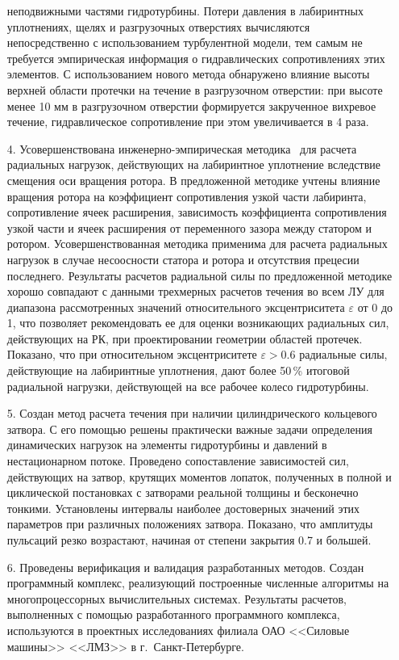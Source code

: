 \begin{enumerate}
            неподвижными частями гидротурбины. Потери давления в лабиринтных уплотнениях, щелях и разгрузочных 
            отверстиях вычисляются непосредственно с использованием турбулентной модели, тем самым не 
            требуется эмпирическая информация о гидравлических сопротивлениях этих элементов. 
            С использованием нового метода обнаружено влияние высоты верхней области протечки на течение в 
            разгрузочном отверстии: при высоте менее 10 мм в разгрузочном отверстии формируется закрученное 
            вихревое течение, гидравлическое сопротивление при этом увеличивается в 4 раза. 
  \item[4.] Усовершенствована инженерно-эмпирическая методика~\cite{lomakin} для расчета радиальных нагрузок, 
            действующих на лабиринтное уплотнение вследствие смещения оси вращения ротора. В предложенной 
            методике учтены влияние вращения ротора на коэффициент сопротивления узкой части лабиринта, 
            сопротивление ячеек расширения, зависимость коэффициента сопротивления узкой части и ячеек 
            расширения от переменного зазора между статором и ротором. Усовершенствованная методика применима 
            для расчета радиальных нагрузок в случае несоосности статора и ротора и отсутствия 
            прецесии последнего. Результаты расчетов радиальной силы по предложенной методике хорошо совпадают 
            с данными трехмерных расчетов течения во всем ЛУ для диапазона рассмотренных значений 
            относительного эксцентриситета $\varepsilon$ от 0 до 1, что позволяет рекомендовать ее 
            для оценки возникающих радиальных сил, действующих на РК, при проектировании геометрии 
            областей протечек. Показано, что при относительном эксцентриситете $\varepsilon>0.6$ радиальные 
            силы, действующие на лабиринтные уплотнения, дают более 50\,\% итоговой радиальной нагрузки, 
            действующей на все рабочее колесо гидротурбины. 
  \item[5.] Создан метод расчета течения при наличии цилиндрического кольцевого затвора. С его помощью решены 
            практически важные задачи определения динамических нагрузок на элементы гидротурбины и давлений в 
            нестационарном потоке. Проведено сопоставление зависимостей сил, действующих на затвор, крутящих 
            моментов лопаток, полученных в полной и циклической постановках с затворами реальной толщины и 
            бесконечно тонкими. Установлены интервалы наиболее достоверных значений этих параметров при 
            различных положениях затвора. Показано, что амплитуды пульсаций резко возрастают, начиная от 
            степени закрытия 0.7 и большей. 
  \item[6.] Проведены верификация и валидация разработанных методов. Создан программный комплекс, реализующий 
            построенные численные алгоритмы на многопроцессорных вычислительных системах. Результаты 
            расчетов, выполненных с помощью разработанного программного комплекса, используются в проектных 
            исследованиях филиала ОАО <<Силовые машины>> <<ЛМЗ>> в г.~Санкт-Петербурге.
\end{enumerate}

%
%
